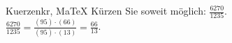 \begin{MAufgabe}{Kuerzen}{kr, MaTeX}
K\"urzen Sie soweit m\"oglich: $\frac{6270}{1235}$.\\ 
\ifLsg\MLoesung
\quad $\frac{6270}{1235}=\frac{(95)\cdot(66)}{(95)\cdot(13)}=\frac{66}{13}$.\else\relax\fi
 \end{MAufgabe}